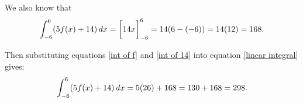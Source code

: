 \documentclass[handout,nooutcomes]{ximera}
\begin{document}
\begin{problem}
\begin{enumerate}
\begin{freeResponse}
		We also know that
			\begin{equation}\label{int of 14}
			\int_{-6}^6 (5f(x) + 14) \,d x = \bigg[ 14x \bigg]_{-6}^6 = 14(6 - (-6)) = 14(12) = 168.
			\end{equation}
			
		Then substituting equations \eqref{int of f} and \eqref{int of 14} into equation \eqref{linear integral} gives:
			\begin{equation*}
			\int_{-6}^6 (5f(x) + 14) \,d x = 5(26) + 168 = 130 + 168 = 298.
			\end{equation*}
		\end{freeResponse}
		
		
		
	\end{enumerate}
		
		
\end{problem}
\end{document}
